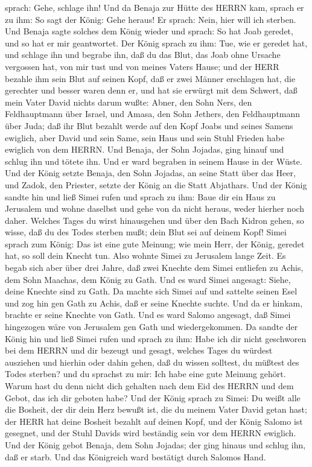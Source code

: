 sprach: Gehe, schlage ihn!  Und da Benaja zur Hütte des
HERRN kam, sprach er zu ihm: So sagt der König: Gehe heraus! Er sprach:
Nein, hier will ich sterben. Und Benaja sagte solches dem König wieder
und sprach: So hat Joab geredet, und so hat er mir geantwortet.
 Der König sprach zu ihm: Tue, wie er geredet hat, und
schlage ihn und begrabe ihn, daß du das Blut, das Joab ohne Ursache
vergossen hat, von mir tust und von meines Vaters Hause; 
und der HERR bezahle ihm sein Blut auf seinen Kopf, daß er zwei Männer
erschlagen hat, die gerechter und besser waren denn er, und hat sie
erwürgt mit dem Schwert, daß mein Vater David nichts darum wußte: Abner,
den Sohn Ners, den Feldhauptmann über Israel, und Amasa, den Sohn
Jethers, den Feldhauptmann über Juda;  daß ihr Blut bezahlt
werde auf den Kopf Joabs und seines Samens ewiglich, aber David und sein
Same, sein Haus und sein Stuhl Frieden habe ewiglich von dem HERRN.
 Und Benaja, der Sohn Jojadas, ging hinauf und schlug ihn
und tötete ihn. Und er ward begraben in seinem Hause in der Wüste.
 Und der König setzte Benaja, den Sohn Jojadas, an seine
Statt über das Heer, und Zadok, den Priester, setzte der König an die
Statt Abjathars.  Und der König sandte hin und ließ Simei
rufen und sprach zu ihm: Baue dir ein Haus zu Jerusalem und wohne
daselbst und gehe von da nicht heraus, weder hierher noch daher.
 Welches Tages du wirst hinausgehen und über den Bach
Kidron gehen, so wisse, daß du des Todes sterben mußt; dein Blut sei auf
deinem Kopf!  Simei sprach zum König: Das ist eine gute
Meinung; wie mein Herr, der König, geredet hat, so soll dein Knecht tun.
Also wohnte Simei zu Jerusalem lange Zeit.  Es begab sich
aber über drei Jahre, daß zwei Knechte dem Simei entliefen zu Achis, dem
Sohn Maachas, dem König zu Gath. Und es ward Simei angesagt: Siehe,
deine Knechte sind zu Gath.  Da machte sich Simei auf und
sattelte seinen Esel und zog hin gen Gath zu Achis, daß er seine Knechte
suchte. Und da er hinkam, brachte er seine Knechte von Gath.
 Und es ward Salomo angesagt, daß Simei hingezogen wäre von
Jerusalem gen Gath und wiedergekommen.  Da sandte der König
hin und ließ Simei rufen und sprach zu ihm: Habe ich dir nicht
geschworen bei dem HERRN und dir bezeugt und gesagt, welches Tages du
würdest ausziehen und hierhin oder dahin gehen, daß du wissen solltest,
du müßtest des Todes sterben? und du sprachst zu mir: Ich habe eine gute
Meinung gehört.  Warum hast du denn nicht dich gehalten
nach dem Eid des HERRN und dem Gebot, das ich dir geboten habe?
 Und der König sprach zu Simei: Du weißt alle die Bosheit,
der dir dein Herz bewußt ist, die du meinem Vater David getan hast; der
HERR hat deine Bosheit bezahlt auf deinen Kopf,  und der
König Salomo ist gesegnet, und der Stuhl Davids wird beständig sein vor
dem HERRN ewiglich.  Und der König gebot Benaja, dem Sohn
Jojadas; der ging hinaus und schlug ihn, daß er starb. Und das
Königreich ward bestätigt durch Salomos Hand.

